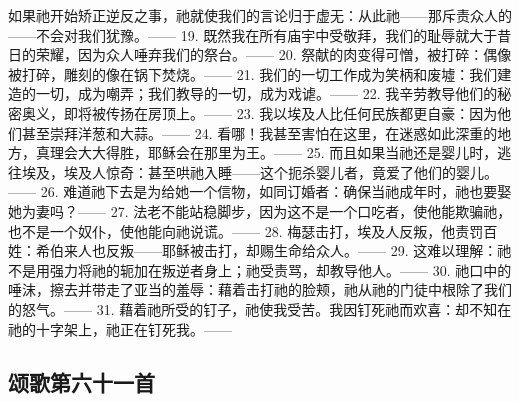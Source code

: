 如果祂开始矫正逆反之事，祂就使我们的言论归于虚无：从此祂——那斥责众人的——不会对我们犹豫。—\newline{}— 19. 既然我在所有庙宇中受敬拜，我们的耻辱就大于昔日的荣耀，因为众人唾弃我们的祭台。—\newline{}— 20. 祭献的肉变得可憎，被打碎：偶像被打碎，雕刻的像在锅下焚烧。—\newline{}— 21. 我们的一切工作成为笑柄和废墟：我们建造的一切，成为嘲弄；我们教导的一切，成为戏谑。—\newline{}— 22. 我辛劳教导他们的秘密奥义，即将被传扬在房顶上。—\newline{}— 23. 我以埃及人比任何民族都更自豪：因为他们甚至崇拜洋葱和大蒜。—\newline{}— 24. 看哪！我甚至害怕在这里，在迷惑如此深重的地方，真理会大大得胜，耶稣会在那里为王。—\newline{}— 25. 而且如果当祂还是婴儿时，逃往埃及，埃及人惊奇：甚至哄祂入睡——这个扼杀婴儿者，竟爱了他们的婴儿。—\newline{}— 26. 难道祂下去是为给她一个信物，如同订婚者：确保当祂成年时，祂也要娶她为妻吗？—\newline{}— 27. 法老不能站稳脚步，因为这不是一个口吃者，使他能欺骗祂，也不是一个奴仆，使他能向祂说谎。—\newline{}— 28. 梅瑟击打，埃及人反叛，他责罚百姓：希伯来人也反叛——耶稣被击打，却赐生命给众人。—\newline{}— 29. 这难以理解：祂不是用强力将祂的轭加在叛逆者身上；祂受责骂，却教导他人。—\newline{}— 30. 祂口中的唾沫，擦去并带走了亚当的羞辱：藉着击打祂的脸颊，祂从祂的门徒中根除了我们的怒气。—\newline{}— 31. 藉着祂所受的钉子，祂使我受苦。我因钉死祂而欢喜：却不知在祂的十字架上，祂正在钉死我。——\par


\subsection{颂歌第六十一首}

